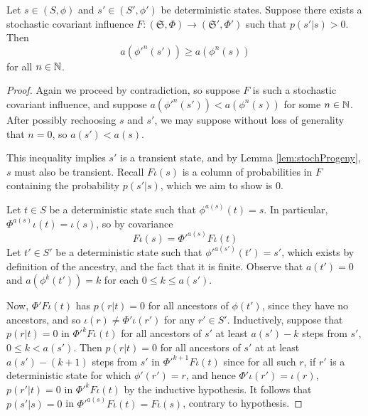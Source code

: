 \begin{lem}[label=lem:stochAncestry]
    Let $s \in (S,\phi)$ and $s' \in (S',\phi')$ be deterministic states. Suppose there exists a stochastic covariant influence $F:(\mathfrak{S},\Phi)\rightarrow (\mathfrak{S}',\Phi')$ such that $p(s'|s) > 0$. Then 
    \begin{equation*}
        a({\phi'}^n(s')) \geq a(\phi^n(s))
    \end{equation*}
    for all $n \in \mathbb N$.
\end{lem}
\begin{proof}
    Again we proceed by contradiction, so suppose $F$ is such a stochastic covariant influence, and suppose $a({\phi'}^n(s')) < a(\phi^n(s))$ for some $n \in \mathbb N$. After possibly rechoosing $s$ and $s'$, we may suppose without loss of generality that $n = 0$, so $a(s') < a(s)$. 


    This inequality implies $s'$ is a transient state, and by Lemma \ref{lem:stochProgeny}, $s$ must also be transient. Recall $F\iota(s)$ is a column of probabilities in $F$ containing the probability $p(s'|s)$, which we aim to show is $0$. 

    Let $t \in S$ be a deterministic state such that $\phi^{a(s)}(t) = s$. In particular, $\Phi^{a(s)}\iota(t) = \iota(s)$, so by covariance
    \begin{equation*}
        F\iota(s) = {\Phi'}^{a(s)}F\iota(t)
    \end{equation*}
    Let $t' \in S'$ be a deterministic state such that ${\phi'}^{a(s')}(t') = s'$, which exists by definition of the ancestry, and the fact that it is finite. Observe that $a(t') = 0$ and $a(\phi^k(t')) = k$ for each $0 \leq k \leq a(s')$. 


    Now, ${\Phi'}F\iota(t)$ has $p(r|t) = 0$ for all ancestors of $\phi(t')$, since they have no ancestors, and so $\iota(r) \neq {\Phi'}\iota(r')$ for any $r' \in S'$. Inductively, suppose that $p(r|t) = 0$ in ${\Phi'}^kF\iota(t)$ for all ancestors of $s'$ at least $a(s')-k$ steps from $s'$, $0 \leq k < a(s')$. Then $p(r|t) = 0$ for all ancestors of $s'$ at at least $a(s')-(k+1)$ steps from $s'$ in ${\Phi'}^{k+1}F\iota(t)$ since for all such $r$, if $r'$ is a deterministic state for which $\phi'(r') = r$, and hence $\Phi'\iota(r') = \iota(r)$, $p(r'|t) = 0$ in ${\Phi'}^kF\iota(t)$ by the inductive hypothesis. It follows that $p(s'|s) = 0$ in ${\Phi'}^{a(s)}F\iota(t) = F\iota(s)$, contrary to hypothesis.
\end{proof}





